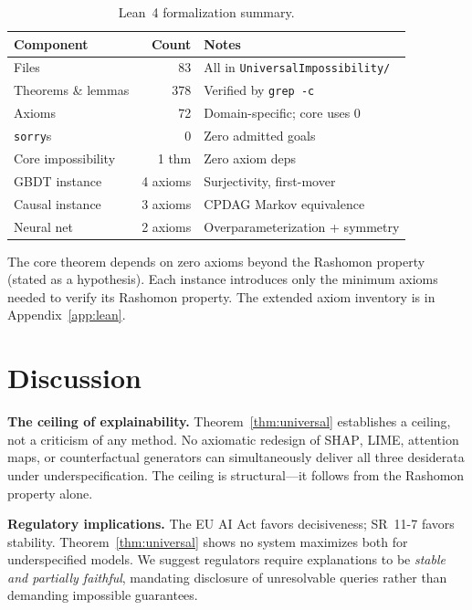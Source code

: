 \documentclass{article}
\newcommand{\SHAP}{\textsc{SHAP}}
\newcommand{\GBDT}{\textsc{GBDT}}
\begin{document}
\begin{table}[h]
\centering
\caption{Lean~4 formalization summary.}
\label{tab:lean}
\small
\begin{tabular}{lrl}
\toprule
Component & Count & Notes \\
\midrule
Files & 83 & All in \texttt{UniversalImpossibility/} \\
Theorems \& lemmas & 378 & Verified by \texttt{grep -c} \\
Axioms & 72 & Domain-specific; core uses 0 \\
\texttt{sorry}s & 0 & Zero admitted goals \\
\midrule
Core impossibility & 1 thm & Zero axiom deps \\
\GBDT{} instance & 4 axioms & Surjectivity, first-mover \\
Causal instance & 3 axioms & CPDAG Markov equivalence \\
Neural net & 2 axioms & Overparameterization + symmetry \\
\bottomrule
\end{tabular}
\end{table}

The core theorem depends on zero axioms beyond the Rashomon property (stated as a hypothesis).  Each instance introduces only the minimum axioms needed to verify its Rashomon property.  The extended axiom inventory is in Appendix~\ref{app:lean}.

\section{Discussion}
\label{sec:discussion}

\textbf{The ceiling of explainability.}
Theorem~\ref{thm:universal} establishes a ceiling, not a criticism of any method.  No axiomatic redesign of \SHAP{}, LIME, attention maps, or counterfactual generators can simultaneously deliver all three desiderata under underspecification.  The ceiling is structural---it follows from the Rashomon property alone.

\textbf{Regulatory implications.}
The EU AI Act favors decisiveness; SR~11-7 favors stability.  Theorem~\ref{thm:universal} shows no system maximizes both for underspecified models.  We suggest regulators require explanations to be \emph{stable and partially faithful}, mandating disclosure of unresolvable queries rather than demanding impossible guarantees.
\end{document}
